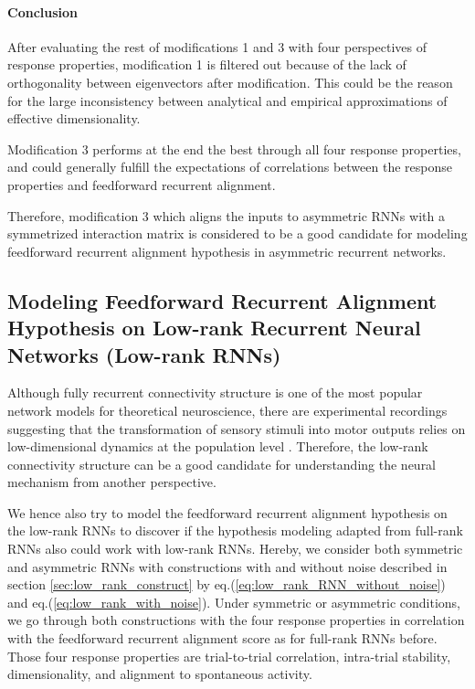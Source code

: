 \documentclass[11pt]{article}
\begin{document}
	\vspace{0.5cm}
	\paragraph{Conclusion}
	After evaluating the rest of modifications 1 and 3 with four perspectives of response properties, modification 1 is filtered out because of the lack of orthogonality between eigenvectors after modification. This could be the reason for the large inconsistency between analytical and empirical approximations of effective dimensionality.
	
	Modification 3 performs at the end the best through all four response properties, and could generally fulfill the expectations of correlations between the response properties and feedforward recurrent alignment. 
	
	Therefore, modification 3 which aligns the inputs to asymmetric RNNs with a symmetrized interaction matrix is considered to be a good candidate for modeling feedforward recurrent alignment hypothesis in asymmetric recurrent networks.
	
	\clearpage
	\subsection{Modeling Feedforward Recurrent Alignment Hypothesis on Low-rank Recurrent Neural Networks (Low-rank RNNs)}
	Although fully recurrent connectivity structure is one of the most popular network models for theoretical neuroscience, there are experimental recordings suggesting that the transformation of sensory stimuli into motor outputs relies on low-dimensional dynamics at the population level \cite{mastrogiuseppe2018linking}. Therefore, the low-rank connectivity structure can be a good candidate for understanding the neural mechanism from another perspective. 
	
	We hence also try to model the feedforward recurrent alignment hypothesis on the low-rank RNNs to discover if the hypothesis modeling adapted from full-rank RNNs also could work with low-rank RNNs. 
	Hereby, we consider both symmetric and asymmetric RNNs with constructions with and without noise described in section \ref{sec:low_rank_construct} by eq.(\ref{eq:low_rank_RNN_without_noise}) and eq.(\ref{eq:low_rank_with_noise}). Under symmetric or asymmetric conditions, we go through both constructions with the four response properties in correlation with the feedforward recurrent alignment score as for full-rank RNNs before. Those four response properties are trial-to-trial correlation, intra-trial stability, dimensionality, and alignment to spontaneous activity. %
	
\end{document}
